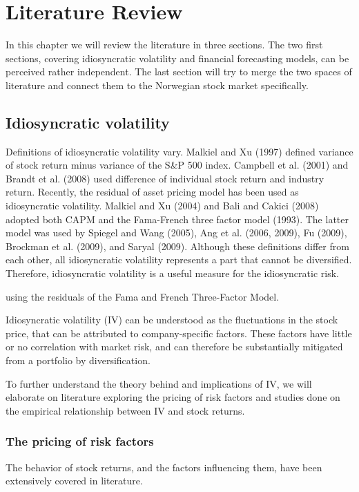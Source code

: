 \chapter{Literature Review}

In this chapter we will review the literature in three sections. The two first sections, covering idiosyncratic volatility and financial forecasting models, can be perceived rather independent. The last section will try to merge the two spaces of literature and connect them to the Norwegian stock market specifically. 

\section*{Idiosyncratic volatility}

Definitions of idiosyncratic volatility vary. Malkiel and Xu (1997) defined variance of stock return minus variance of the S&P 500 index. Campbell et al. (2001) and Brandt et al. (2008) used difference of individual stock return and industry return. Recently, the residual of asset pricing model has been used as idiosyncratic volatility. Malkiel and Xu (2004) and Bali and Cakici (2008) adopted both CAPM and the Fama-French three factor model (1993). The latter model was used by Spiegel and Wang (2005), Ang et al. (2006, 2009), Fu (2009), Brockman et al. (2009), and Saryal (2009). Although these definitions differ from each other, all idiosyncratic volatility represents a part that cannot be diversified. Therefore, idiosyncratic volatility is a useful measure for the idiosyncratic risk.

using the residuals of the Fama and French Three-Factor Model.


Idiosyncratic volatility (IV) can be understood as the fluctuations in the stock price, that can be attributed to company-specific factors. These factors have little or no correlation with market risk, and can therefore be substantially mitigated from a portfolio by diversification.

To further understand the theory behind and implications of IV, we will elaborate on literature exploring the pricing of risk factors and studies done on the empirical relationship between IV and stock returns.

\subsection*{The pricing of risk factors}
The behavior of stock returns, and the factors influencing them, have been extensively covered in literature.

